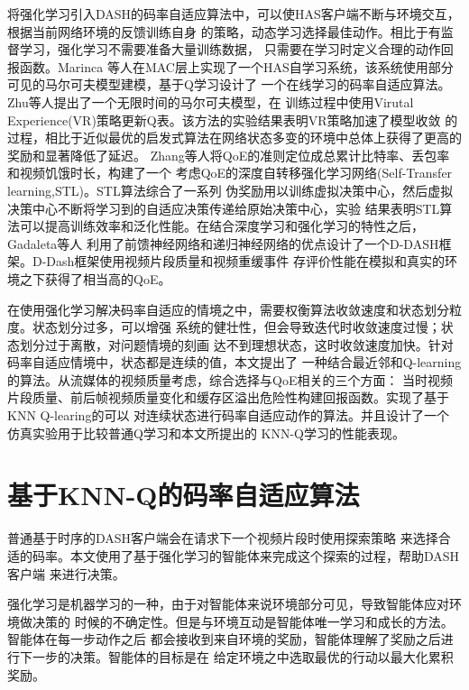 \documentclass[twocolumn]{article}
\begin{document}
将强化学习引入DASH的码率自适应算法中，可以使HAS客户端不断与环境交互，根据当前网络环境的反馈训练自身
的策略，动态学习选择最佳动作。相比于有监督学习，强化学习不需要准备大量训练数据，
只需要在学习时定义合理的动作回报函数。Marinca\cite{RN10}
等人在MAC层上实现了一个HAS自学习系统，该系统使用部分可见的马尔可夫模型建模，基于Q学习设计了
一个在线学习的码率自适应算法。Zhu等人\cite{RN11}提出了一个无限时间的马尔可夫模型，在
训练过程中使用Virutal Experience(VR)策略更新Q表。该方法的实验结果表明VR策略加速了模型收敛
的过程，相比于近似最优的启发式算法在网络状态多变的环境中总体上获得了更高的奖励和显著降低了延迟。
Zhang\cite{RN12}等人将QoE的准则定位成总累计比特率、丢包率和视频饥饿时长，构建了一个
考虑QoE的深度自转移强化学习网络(Self-Transfer learning,STL)。STL算法综合了一系列
伪奖励用以训练虚拟决策中心，然后虚拟决策中心不断将学习到的自适应决策传递给原始决策中心，实验
结果表明STL算法可以提高训练效率和泛化性能。在结合深度学习和强化学习的特性之后，Gadaleta等人\cite{RN14}
利用了前馈神经网络和递归神经网络的优点设计了一个D-DASH框架。D-Dash框架使用视频片段质量和视频重缓事件
存评价性能在模拟和真实的环境之下获得了相当高的QoE。

在使用强化学习解决码率自适应的情境之中，需要权衡算法收敛速度和状态划分粒度。状态划分过多，可以增强
系统的健壮性，但会导致迭代时收敛速度过慢；状态划分过于离散，对问题情境的刻画
达不到理想状态，这时收敛速度加快。针对码率自适应情境中，状态都是连续的值，本文提出了
一种结合最近邻和Q-learning的算法。从流媒体的视频质量考虑，综合选择与QoE相关的三个方面：
当时视频片段质量、前后帧视频质量变化和缓存区溢出危险性构建回报函数。实现了基于KNN Q-learing的可以
对连续状态进行码率自适应动作的算法。并且设计了一个仿真实验用于比较普通Q学习和本文所提出的
KNN-Q学习的性能表现。

\section{基于KNN-Q的码率自适应算法}

普通基于时序的DASH客户端会在请求下一个视频片段时使用探索策略
来选择合适的码率。本文使用了基于强化学习的智能体来完成这个探索的过程，帮助DASH客户端
来进行决策。

强化学习是机器学习的一种，由于对智能体来说环境部分可见，导致智能体应对环境做决策的
时候的不确定性。但是与环境互动是智能体唯一学习和成长的方法。智能体在每一步动作之后
都会接收到来自环境的奖励，智能体理解了奖励之后进行下一步的决策。智能体的目标是在
给定环境之中选取最优的行动以最大化累积奖励。\cite{RN13}
\end{document}
